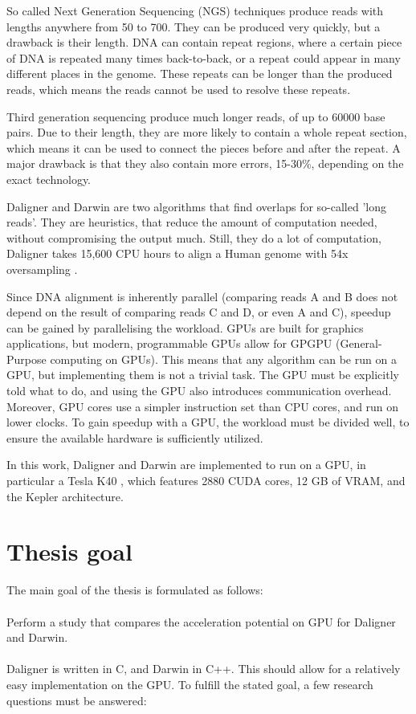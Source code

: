 \documentclass[../thesis.tex]{subfiles}
\begin{document}
So called Next Generation Sequencing (NGS) techniques produce reads with lengths anywhere from 50 to 700.
They can be produced very quickly, but a drawback is their length.
DNA can contain repeat regions, where a certain piece of DNA is repeated many times back-to-back, or a repeat could appear in many different places in the genome.
These repeats can be longer than the produced reads, which means the reads cannot be used to resolve these repeats.

Third generation sequencing produce much longer reads, of up to 60000 base pairs.
Due to their length, they are more likely to contain a whole repeat section, which means it can be used to connect the pieces before and after the repeat.
A major drawback is that they also contain more errors, 15-30\%, depending on the exact technology.

Daligner and Darwin are two algorithms that find overlaps for so-called 'long reads'.
They are heuristics, that reduce the amount of computation needed, without compromising the output much.
Still, they do a lot of computation, Daligner takes 15,600 CPU hours to align a Human genome with 54x oversampling \cite{Daligner}.

Since DNA alignment is inherently parallel (comparing reads A and B does not depend on the result of comparing reads C and D, or even A and C), speedup can be gained by parallelising the workload.
GPUs are built for graphics applications, but modern, programmable GPUs allow for GPGPU (General-Purpose computing on GPUs).
This means that any algorithm can be run on a GPU, but implementing them is not a trivial task.
The GPU must be explicitly told what to do, and using the GPU also introduces communication overhead.
Moreover, GPU cores use a simpler instruction set than CPU cores, and run on lower clocks.
To gain speedup with a GPU, the workload must be divided well, to ensure the available hardware is sufficiently utilized.

In this work, Daligner and Darwin are implemented to run on a GPU, in particular a Tesla K40 \cite{K40}, which features 2880 CUDA cores, 12 GB of VRAM, and the Kepler architecture.

\section{Thesis goal}
The main goal of the thesis is formulated as follows: \\\\
\indent Perform a study that compares the acceleration potential on GPU for Daligner and Darwin.
\\\\
Daligner is written in C, and Darwin in C++.
This should allow for a relatively easy implementation on the GPU.
To fulfill the stated goal, a few research questions must be answered:
\end{document}

